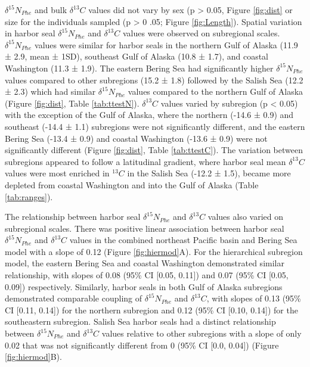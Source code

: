 \documentclass [11pt, proquest] {uwthesis}[2015/03/03]
\begin{document}
\(\delta^{15}N_{Phe}\) and bulk \(\delta^{13}C\) values did not vary by sex (p \textgreater{} 0.05, Figure \ref{fig:dist} or size for the individuals sampled (p \textgreater{} 0 .05; Figure \ref{fig:Length}). Spatial variation in harbor seal \(\delta^{15}N_{Phe}\) and \(\delta^{13}C\) values were observed on subregional scales. \(\delta^{15}N_{Phe}\) values were similar for harbor seals in the northern Gulf of Alaska (11.9 ± 2.9, mean ± 1SD), southeast Gulf of Alaska (10.8 ± 1.7), and coastal Washington (11.3 ± 1.9). The eastern Bering Sea had significantly higher \(\delta^{15}N_{Phe}\) values compared to other subregions (15.2 ± 1.8) followed by the Salish Sea (12.2 ± 2.3) which had similar \(\delta^{15}N_{Phe}\) values compared to the northern Gulf of Alaska (Figure \ref{fig:dist}, Table \ref{tab:ttestN}). \(\delta^{13}C\) values varied by subregion (p \textless{} 0.05) with the exception of the Gulf of Alaska, where the northern (-14.6 ± 0.9) and southeast (-14.4 ± 1.1) subregions were not significantly different, and the eastern Bering Sea (-13.4 ± 0.9) and coastal Washington (-13.6 ± 0.9) were not significantly different (Figure \ref{fig:dist}, Table \ref{tab:ttestC}). The variation between subregions appeared to follow a latitudinal gradient, where harbor seal mean \(\delta^{13}C\) values were most enriched in \(^{13}C\) in the Salish Sea (-12.2 ± 1.5), became more depleted from coastal Washington and into the Gulf of Alaska (Table \ref{tab:ranges}).

The relationship between harbor seal \(\delta^{15}N_{Phe}\) and \(\delta^{13}C\) values also varied on subregional scales. There was positive linear association between harbor seal \(\delta^{15}N_{Phe}\) and \(\delta^{13}C\) values in the combined northeast Pacific basin and Bering Sea model with a slope of 0.12 (Figure \ref{fig:hiermod}A). For the hierarchical subregion model, the eastern Bering Sea and coastal Washington demonstrated similar relationship, with slopes of 0.08 (95\% CI {[}0.05, 0.11{]}) and 0.07 (95\% CI {[}0.05, 0.09{]}) respectively. Similarly, harbor seals in both Gulf of Alaska subregions demonstrated comparable coupling of \(\delta^{15}N_{Phe}\) and \(\delta^{13}C\), with slopes of 0.13 (95\% CI {[}0.11, 0.14{]}) for the northern subregion and 0.12 (95\% CI {[}0.10, 0.14{]}) for the southeastern subregion. Salish Sea harbor seals had a distinct relationship between \(\delta^{15}N_{Phe}\) and \(\delta^{13}C\) values relative to other subregions with a slope of only 0.02 that was not significantly different from 0 (95\% CI {[}0.0, 0.04{]}) (Figure \ref{fig:hiermod}B).
\end{document}

